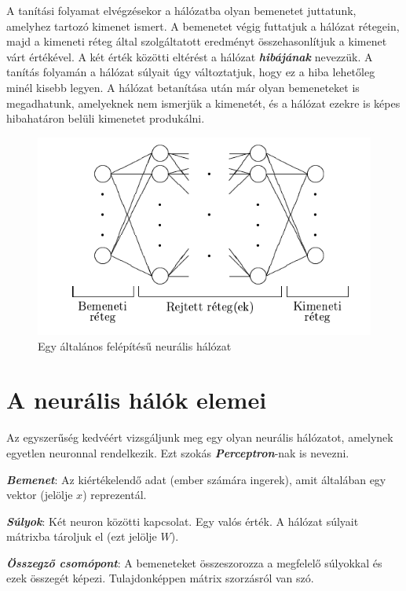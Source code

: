 A tanítási folyamat elvégzésekor a hálózatba olyan bemenetet juttatunk, amelyhez tartozó kimenet ismert. A bemenetet végig futtatjuk a hálózat rétegein, majd a kimeneti réteg által szolgáltatott eredményt összehasonlítjuk a kimenet várt értékével. A két érték közötti eltérést a hálózat \textit{\textbf{hibájának}} nevezzük. A tanítás folyamán a hálózat súlyait úgy változtatjuk, hogy ez a hiba lehetőleg minél kisebb legyen. A hálózat betanítása után már olyan bemeneteket is megadhatunk, amelyeknek nem ismerjük a kimenetét, és a hálózat ezekre is képes hibahatáron belüli kimenetet produkálni.

\begin{figure}[h]
	\centering
	\includegraphics[scale=0.75]{images/ANNLayers.png}
	\caption{Egy általános felépítésű neurális hálózat\cite{neuralis77}}
\end{figure}

\section{A neurális hálók elemei}

Az egyszerűség kedvéért vizsgáljunk meg egy olyan neurális hálózatot, amelynek egyetlen neuronnal rendelkezik. Ezt szokás \textbf{\textit{Perceptron}}-nak is nevezni.

\textbf{\textit{Bemenet}}: Az kiértékelendő adat (ember számára ingerek), amit általában egy vektor (jelölje $x$) reprezentál.

\textit{\textbf{Súlyok}}: Két neuron közötti kapcsolat. Egy valós érték. A hálózat súlyait mátrixba tároljuk el (ezt jelölje $W$).

\textbf{\textit{Összegző csomópont}}: A bemeneteket összeszorozza a megfelelő súlyokkal és ezek összegét képezi. Tulajdonképpen mátrix szorzásról van szó.

